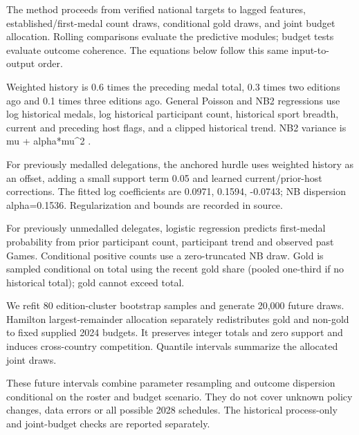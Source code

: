 \documentclass[11pt,a4paper]{article}
\begin{document}
The method proceeds from verified national targets to lagged features, established/first-medal count draws, conditional gold draws, and joint budget allocation. Rolling comparisons evaluate the predictive modules; budget tests evaluate outcome coherence. The equations below follow this same input-to-output order.

Weighted history is 0.6 times the preceding medal total, 0.3 times two editions ago and 0.1 times three editions ago. General Poisson and NB2 regressions use log historical medals, log historical participant count, historical sport breadth, current and preceding host flags, and a clipped historical trend. NB2 variance is mu + alpha*mu\textasciicircum{}2 \cite{nb2-doc}.

For previously medalled delegations, the anchored hurdle uses weighted history as an offset, adding a small support term 0.05 and learned current/prior-host corrections. The fitted log coefficients are 0.0971, 0.1594, -0.0743; NB dispersion alpha=0.1536. Regularization and bounds are recorded in source.

For previously unmedalled delegates, logistic regression predicts first-medal probability from prior participant count, participant trend and observed past Games. Conditional positive counts use a zero-truncated NB draw. Gold is sampled conditional on total using the recent gold share (pooled one-third if no historical total); gold cannot exceed total.

We refit 80 edition-cluster bootstrap samples and generate 20,000 future draws. Hamilton largest-remainder allocation separately redistributes gold and non-gold to fixed supplied 2024 budgets. It preserves integer totals and zero support and induces cross-country competition. Quantile intervals summarize the allocated joint draws.

These future intervals combine parameter resampling and outcome dispersion conditional on the roster and budget scenario. They do not cover unknown policy changes, data errors or all possible 2028 schedules. The historical process-only and joint-budget checks are reported separately.
\end{document}
